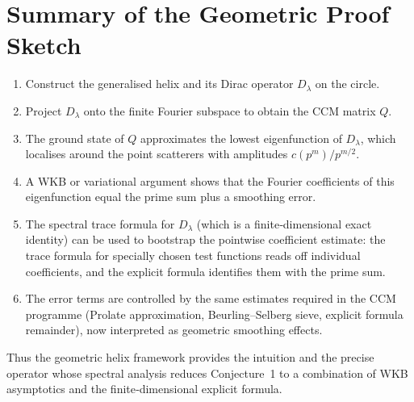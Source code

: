 \documentclass[12pt,a4paper]{article}
\begin{document}
\section{Summary of the Geometric Proof Sketch}
\begin{enumerate}
\item Construct the generalised helix and its Dirac operator \(D_\lambda\) on the circle.
\item Project \(D_\lambda\) onto the finite Fourier subspace to obtain the CCM matrix \(Q\).
\item The ground state of \(Q\) approximates the lowest eigenfunction of \(D_\lambda\), which localises around the point scatterers with amplitudes \(c(p^m)/p^{m/2}\).
\item A WKB or variational argument shows that the Fourier coefficients of this eigenfunction equal the prime sum plus a smoothing error.
\item The spectral trace formula for \(D_\lambda\) (which is a finite‑dimensional exact identity) can be used to bootstrap the pointwise coefficient estimate: the trace formula for specially chosen test functions reads off individual coefficients, and the explicit formula identifies them with the prime sum.
\item The error terms are controlled by the same estimates required in the CCM programme (Prolate approximation, Beurling–Selberg sieve, explicit formula remainder), now interpreted as geometric smoothing effects.
\end{enumerate}
Thus the geometric helix framework provides the intuition and the precise operator whose spectral analysis reduces Conjecture~1 to a combination of WKB asymptotics and the finite‑dimensional explicit formula.
\end{document}
